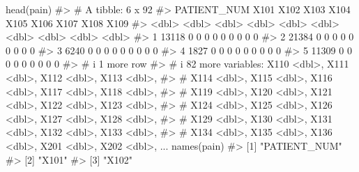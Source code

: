 \documentclass[
  letterpaper,
]{krantz}
\makeatletter
\newenvironment{Shaded}{\begin{snugshade}}{\end{snugshade}}
\newcommand{\CommentTok}[1]{\textcolor[rgb]{0.37,0.37,0.37}{#1}}
\newcommand{\FunctionTok}[1]{\textcolor[rgb]{0.28,0.35,0.67}{#1}}
\newcommand{\NormalTok}[1]{\textcolor[rgb]{0.00,0.23,0.31}{#1}}
\newenvironment{kframe}{%
\medskip{}
\setlength{\fboxsep}{.8em}
 \def\at@end@of@kframe{}%
 \ifinner\ifhmode%
  \def\at@end@of@kframe{\end{minipage}}%
  \begin{minipage}{\columnwidth}%
 \fi\fi%
 \def\FrameCommand##1{\hskip\@totalleftmargin \hskip-\fboxsep
 \colorbox{shadecolor}{##1}\hskip-\fboxsep
     \hskip-\linewidth \hskip-\@totalleftmargin \hskip\columnwidth}%
 \MakeFramed {\advance\hsize-\width
   \@totalleftmargin\z@ \linewidth\hsize
   \@setminipage}}%
 {\par\unskip\endMakeFramed%
 \at@end@of@kframe}
\renewenvironment{Shaded}{\begin{kframe}}{\end{kframe}}
\makeatother
\begin{document}
\begin{Shaded}
\begin{Highlighting}[]
\FunctionTok{head}\NormalTok{(pain)}
\CommentTok{\#\textgreater{} \# A tibble: 6 x 92}
\CommentTok{\#\textgreater{}   PATIENT\_NUM  X101  X102  X103  X104  X105  X106  X107  X108  X109}
\CommentTok{\#\textgreater{}         \textless{}dbl\textgreater{} \textless{}dbl\textgreater{} \textless{}dbl\textgreater{} \textless{}dbl\textgreater{} \textless{}dbl\textgreater{} \textless{}dbl\textgreater{} \textless{}dbl\textgreater{} \textless{}dbl\textgreater{} \textless{}dbl\textgreater{} \textless{}dbl\textgreater{}}
\CommentTok{\#\textgreater{} 1       13118     0     0     0     0     0     0     0     0     0}
\CommentTok{\#\textgreater{} 2       21384     0     0     0     0     0     0     0     0     0}
\CommentTok{\#\textgreater{} 3        6240     0     0     0     0     0     0     0     0     0}
\CommentTok{\#\textgreater{} 4        1827     0     0     0     0     0     0     0     0     0}
\CommentTok{\#\textgreater{} 5       11309     0     0     0     0     0     0     0     0     0}
\CommentTok{\#\textgreater{} \# i 1 more row}
\CommentTok{\#\textgreater{} \# i 82 more variables: X110 \textless{}dbl\textgreater{}, X111 \textless{}dbl\textgreater{}, X112 \textless{}dbl\textgreater{}, X113 \textless{}dbl\textgreater{},}
\CommentTok{\#\textgreater{} \#   X114 \textless{}dbl\textgreater{}, X115 \textless{}dbl\textgreater{}, X116 \textless{}dbl\textgreater{}, X117 \textless{}dbl\textgreater{}, X118 \textless{}dbl\textgreater{},}
\CommentTok{\#\textgreater{} \#   X119 \textless{}dbl\textgreater{}, X120 \textless{}dbl\textgreater{}, X121 \textless{}dbl\textgreater{}, X122 \textless{}dbl\textgreater{}, X123 \textless{}dbl\textgreater{},}
\CommentTok{\#\textgreater{} \#   X124 \textless{}dbl\textgreater{}, X125 \textless{}dbl\textgreater{}, X126 \textless{}dbl\textgreater{}, X127 \textless{}dbl\textgreater{}, X128 \textless{}dbl\textgreater{},}
\CommentTok{\#\textgreater{} \#   X129 \textless{}dbl\textgreater{}, X130 \textless{}dbl\textgreater{}, X131 \textless{}dbl\textgreater{}, X132 \textless{}dbl\textgreater{}, X133 \textless{}dbl\textgreater{},}
\CommentTok{\#\textgreater{} \#   X134 \textless{}dbl\textgreater{}, X135 \textless{}dbl\textgreater{}, X136 \textless{}dbl\textgreater{}, X201 \textless{}dbl\textgreater{}, X202 \textless{}dbl\textgreater{}, ...}
\FunctionTok{names}\NormalTok{(pain)}
\CommentTok{\#\textgreater{}  [1] "PATIENT\_NUM"                     }
\CommentTok{\#\textgreater{}  [2] "X101"                            }
\CommentTok{\#\textgreater{}  [3] "X102"                            }

\end{Highlighting}
\end{Shaded}
\end{document}
